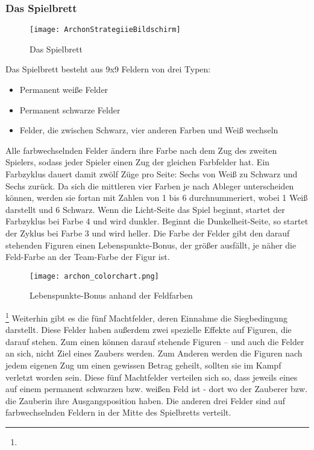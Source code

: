 \subsubsection{Das Spielbrett}
\begin{figure}[htp]
	\centering
	\captionsetup{justification=centering}
	\texttt{[image: ArchonStrategiieBildschirm]}
	\caption[Das Spielbrett]{Das Spielbrett \footnotemark}
	\label{fig:StrategyBoard}
\end{figure}
Das Spielbrett besteht aus 9x9 Feldern von drei Typen: 
\begin{itemize}
	\item Permanent weiße Felder
	\item Permanent schwarze Felder
	\item Felder, die zwischen Schwarz, vier anderen Farben und Weiß wechseln
\end{itemize}
Alle farbwechselnden Felder ändern ihre Farbe nach dem Zug des zweiten Spielers, sodass jeder Spieler einen Zug der gleichen Farbfelder hat. Ein Farbzyklus dauert damit zwölf Züge pro Seite: Sechs von Weiß zu Schwarz und Sechs zurück.
Da sich die mittleren vier Farben je nach Ableger unterscheiden können, werden sie fortan mit Zahlen von 1 bis 6 durchnummeriert, wobei 1 Weiß darstellt und 6 Schwarz.
Wenn die Licht-Seite das Spiel beginnt, startet der Farbzyklus bei Farbe 4 und wird dunkler. Beginnt die Dunkelheit-Seite, so startet der Zyklus bei Farbe 3 und wird heller. Die Farbe der Felder gibt den darauf stehenden Figuren einen Lebenspunkte-Bonus, der größer ausfällt, je näher die Feld-Farbe an der Team-Farbe der Figur ist.
\begin{figure}[htp]
	\centering
	\captionsetup{justification=centering}
	\texttt{[image: archon\_colorchart.png]}
	\caption[Lebenspunkte-Bonus]{Lebenspunkte-Bonus anhand der Feldfarben\footnotemark}
	\label{fig:HP-Bonus}
\end{figure}
\footnote{}
Weiterhin gibt es die fünf Machtfelder, deren Einnahme die Siegbedingung darstellt. Diese Felder haben außerdem zwei spezielle Effekte auf Figuren, die darauf stehen. Zum einen können darauf stehende Figuren -- und auch die Felder an sich, nicht Ziel eines Zaubers werden. Zum Anderen werden die Figuren nach jedem eigenen Zug um einen gewissen Betrag geheilt, sollten sie im Kampf verletzt worden sein. Diese fünf Machtfelder verteilen sich so, dass jeweils eines auf einem permanent schwarzen bzw. weißen Feld ist - dort wo der Zauberer bzw. die Zauberin ihre Ausgangsposition haben. Die anderen drei Felder sind auf farbwechselnden Feldern in der Mitte des Spielbretts verteilt.

